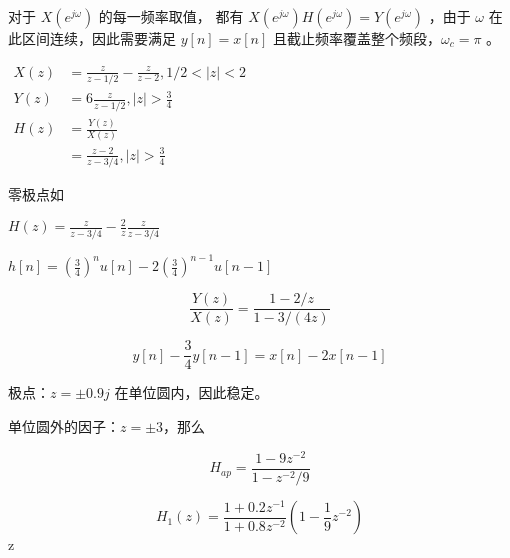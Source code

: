 \documentclass[lang=cn,11pt,a4paper,cite=authoryear,twocolumn]{elegantpaper}
\begin{document}
对于 \(X(e^{j\omega})\) 的每一频率取值，
都有 \(X(e^{j\omega}) H(e^{j\omega}) = Y(e^{j\omega})\) ，由于 \(\omega\) 在此区间连续，因此需要满足 \(y[n] = x[n]\) 且截止频率覆盖整个频段，\(\omega_c = \pi\) 。



\(\begin{aligned}
    X(z) &= \frac{z}{z-1/2}-\frac{z}{z-2}, 1/2 < |z| < 2\\
    Y(z) &= 6 \frac{z}{z-1/2} , |z| > \frac{3}{4}\\
    H(z) &= \frac{Y(z)}{X(z)} \\
    &= \frac{z-2}{z-3/4}, |z| > \frac{3}{4}
\end{aligned}\)

零极点如 



\(H(z) = \frac{z}{z-3/4} - \frac{2}{z}\frac{z}{z-3/4}\)

\(h[n] = (\frac{3}{4})^n u[n] - 2 (\frac{3}{4})^{n-1} u[n-1]\)


\[\frac{Y(z)}{X(z)} = \frac{1-2/z}{1-3/(4z)}\]

\[y[n] - \frac{3}{4}y[n-1] = x[n] - 2 x[n-1]\]



极点：\(z=\pm 0.9 j\) 在单位圆内，因此稳定。


单位圆外的因子：\(z=\pm 3\)，那么

\[H_{ap} = \frac{1-9z^{-2}}{1-z^{-2}/9}\]

\[H_1(z) = \frac{1+0.2z^{-1}}{1+0.8z^{-2}} (1-\frac{1}{9}z^{-2})\]z




\end{document}
